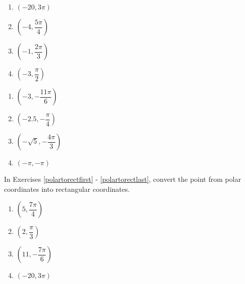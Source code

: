 \documentclass{ximera}
\begin{document}
\begin{multicols}{4} 

\begin{enumerate}

\setcounter{enumi}{\value{HW}}

\item $\left( -20, 3\pi \right)$ 
\item $\left( -4, \dfrac{5\pi}{4} \right)$
\item $\left( -1, \dfrac{2\pi}{3} \right)$
\item $\left( -3, \dfrac{\pi}{2} \right)$ 

\setcounter{HW}{\value{enumi}}

\end{enumerate}

\end{multicols}

\begin{multicols}{4} 

\begin{enumerate}

\setcounter{enumi}{\value{HW}}

\item $\left( -3, -\dfrac{11\pi}{6} \right)$
\item $\left( -2.5, -\dfrac{\pi}{4} \right)$ 
\item $\left( -\sqrt{5}, -\dfrac{4\pi}{3} \right)$
\item $\left( -\pi, -\pi \right)$  \label{polarpointgraphlast}

\setcounter{HW}{\value{enumi}}

\end{enumerate}

\end{multicols}

In Exercises \ref{polartorectfirst} - \ref{polartorectlast}, convert the point from polar coordinates into rectangular coordinates.  

\begin{multicols}{4}

\begin{enumerate}

\setcounter{enumi}{\value{HW}}

\item $\left( 5, \dfrac{7\pi}{4} \right)$ \label{polartorectfirst} 
\item $\left( 2, \dfrac{\pi}{3} \right)$ 
\item $\left( 11, -\dfrac{7\pi}{6} \right)$
\item $\left( -20, 3\pi \right)$ 

\setcounter{HW}{\value{enumi}}

\end{enumerate}

\end{multicols}
\end{document}

